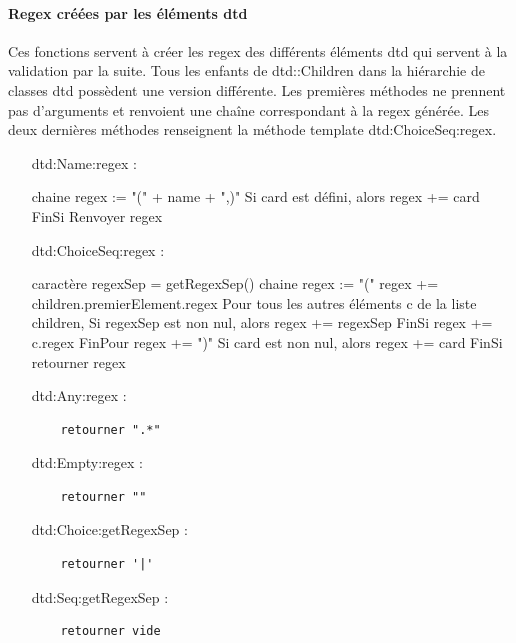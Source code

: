 \documentclass[10pt,a4paper]{article}
\begin{document}
\paragraph{Regex créées par les éléments dtd}
Ces fonctions servent à créer les regex des différents éléments dtd qui servent à la validation par la suite. Tous les enfants de dtd::Children dans la hiérarchie de classes dtd possèdent une version différente. Les premières méthodes ne prennent pas d'arguments et renvoient une chaîne correspondant à la regex générée. Les deux dernières méthodes renseignent la méthode template dtd:ChoiceSeq:regex.

\begin{itemize}
\item[dtd:Name:regex] :
\begin{verbatimtab}
	chaine regex := "(" + name + ",)"
	Si card est défini, alors
		regex += card
	FinSi
	Renvoyer regex
\end{verbatimtab}
\item[dtd:ChoiceSeq:regex] :
\begin{verbatimtab}
	caractère regexSep = getRegexSep()
	chaine regex := "("
	regex += children.premierElement.regex
	Pour tous les autres éléments c de la liste children,
		Si regexSep est non nul, alors
			regex += regexSep
		FinSi
		regex += c.regex
	FinPour
	regex += ")"
	Si card est non nul, alors
		regex += card
	FinSi
	retourner regex
\end{verbatimtab}
\item[dtd:Any:regex] :
\begin{verbatim}
	retourner ".*"
\end{verbatim}
\item[dtd:Empty:regex] :
\begin{verbatim}
	retourner ""
\end{verbatim}
\item[dtd:Choice:getRegexSep] :
\begin{verbatim}
	retourner '|'
\end{verbatim}
\item[dtd:Seq:getRegexSep] :
\begin{verbatim}
	retourner vide
\end{verbatim}
\end{itemize}
\end{document}
